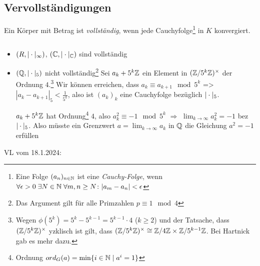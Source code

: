 \documentclass[../main.tex]{subfiles}
\begin{document}
\subsection{Vervollständigungen}
\begin{definition}
    Ein Körper mit Betrag ist \emph{vollständig}, wenn jede Cauchyfolge\footnote{Eine Folge $(a_n)_{n\in\mathbb{N}}$ ist eine \emph{Cauchy-Folge}, wenn $\forall\epsilon>0\;\exists N\in \mathbb{N}\;\forall m,n\geq N\colon |a_m - a_n| <\epsilon$} in $K$ konvergiert.
\end{definition}
\begin{example} \label{theo:4.18}$ $
    \begin{itemize}
        \item $(R,|\cdot|_\infty)$, $(\mathbb{C}, |\cdot|_{\mathbb{C}})$ sind vollständig
        \item $(\mathbb{Q}, |\cdot|_5)$ nicht vollständig\footnote{Das Argument gilt für alle Primzahlen $p\equiv 1\mod 4$}
        Sei $a_k + 5^k\mathbb{Z}$ ein Element in $(\mathbb{Z}/5^k\mathbb{Z})^\times$ der Ordnung $4$.\footnote{Wegen $\phi(5^k) = 5^k-5^{k-1}  = 5^{k-1} \cdot 4$ ($k\geq 2$) und der Tatsache, dass $(\mathbb{Z}/5^k\mathbb{Z})^\times$ yzklisch ist gilt, dass $(\mathbb{Z}/5^k\mathbb{Z})^\times \cong \mathbb{Z}/4\mathbb{Z} \times \mathbb{Z}/5^{k-1}\mathbb{Z}$. Bei Hartnick gab es mehr dazu.}
        Wir können erreichen, dass $a_k\equiv a_{k+1}\mod 5^k$
        => $|a_k-a_{k+1}|_5 < \frac{1}{5^k}$, also ist $(a_k)_k$ eine Cauchyfolge bezüglich $|\cdot|_5$.

        $a_k + 5^k\mathbb{Z}$ hat Ordnung\footnote{Ordnung $ord_G(a) = \min\{i\in\mathbb{N}\mid a^i = 1\}$} $4$, also $a_k^2 \equiv -1 \mod 5^k$ $\Longrightarrow$ $\lim_{k\rightarrow \infty} a_k^2 = -1$ bez $|\cdot|_5$.
        Also müsste ein Grenzwert $a=\lim_{k\rightarrow \infty} a_k$ in $\mathbb{Q}$ die Gleichung $a^2= -1$ erfüllen \Lightning
    \end{itemize}
\end{example}

\begin{flushright}
VL vom 18.1.2024:
\end{flushright}
\end{document}
